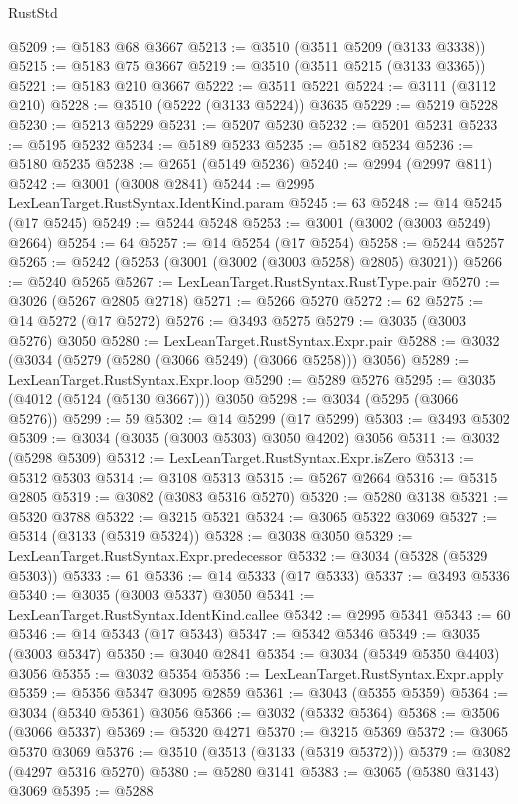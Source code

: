 \begin{lexlean}{RustStd}
\begin{coremodule}
@5209 := @5183 @68 @3667
@5213 := @3510 (@3511 @5209 (@3133 @3338))
@5215 := @5183 @75 @3667
@5219 := @3510 (@3511 @5215 (@3133 @3365))
@5221 := @5183 @210 @3667
@5222 := @3511 @5221
@5224 := @3111 (@3112 @210)
@5228 := @3510 (@5222 (@3133 @5224)) @3635
@5229 := @5219 @5228
@5230 := @5213 @5229
@5231 := @5207 @5230
@5232 := @5201 @5231
@5233 := @5195 @5232
@5234 := @5189 @5233
@5235 := @5182 @5234
@5236 := @5180 @5235
@5238 := @2651 (@5149 @5236)
@5240 := @2994 (@2997 @811)
@5242 := @3001 (@3008 @2841)
@5244 := @2995 LexLeanTarget.RustSyntax.IdentKind.param
@5245 := 63
@5248 := @14 @5245 (@17 @5245)
@5249 := @5244 @5248
@5253 := @3001 (@3002 (@3003 @5249) @2664)
@5254 := 64
@5257 := @14 @5254 (@17 @5254)
@5258 := @5244 @5257
@5265 := @5242 (@5253 (@3001 (@3002 (@3003 @5258) @2805) @3021))
@5266 := @5240 @5265
@5267 := LexLeanTarget.RustSyntax.RustType.pair
@5270 := @3026 (@5267 @2805 @2718)
@5271 := @5266 @5270
@5272 := 62
@5275 := @14 @5272 (@17 @5272)
@5276 := @3493 @5275
@5279 := @3035 (@3003 @5276) @3050
@5280 := LexLeanTarget.RustSyntax.Expr.pair
@5288 := @3032 (@3034 (@5279 (@5280 (@3066 @5249) (@3066 @5258))) @3056)
@5289 := LexLeanTarget.RustSyntax.Expr.loop
@5290 := @5289 @5276
@5295 := @3035 (@4012 (@5124 (@5130 @3667))) @3050
@5298 := @3034 (@5295 (@3066 @5276))
@5299 := 59
@5302 := @14 @5299 (@17 @5299)
@5303 := @3493 @5302
@5309 := @3034 (@3035 (@3003 @5303) @3050 @4202) @3056
@5311 := @3032 (@5298 @5309)
@5312 := LexLeanTarget.RustSyntax.Expr.isZero
@5313 := @5312 @5303
@5314 := @3108 @5313
@5315 := @5267 @2664
@5316 := @5315 @2805
@5319 := @3082 (@3083 @5316 @5270)
@5320 := @5280 @3138
@5321 := @5320 @3788
@5322 := @3215 @5321
@5324 := @3065 @5322 @3069
@5327 := @5314 (@3133 (@5319 @5324))
@5328 := @3038 @3050
@5329 := LexLeanTarget.RustSyntax.Expr.predecessor
@5332 := @3034 (@5328 (@5329 @5303))
@5333 := 61
@5336 := @14 @5333 (@17 @5333)
@5337 := @3493 @5336
@5340 := @3035 (@3003 @5337) @3050
@5341 := LexLeanTarget.RustSyntax.IdentKind.callee
@5342 := @2995 @5341
@5343 := 60
@5346 := @14 @5343 (@17 @5343)
@5347 := @5342 @5346
@5349 := @3035 (@3003 @5347)
@5350 := @3040 @2841
@5354 := @3034 (@5349 @5350 @4403) @3056
@5355 := @3032 @5354
@5356 := LexLeanTarget.RustSyntax.Expr.apply
@5359 := @5356 @5347 @3095 @2859
@5361 := @3043 (@5355 @5359)
@5364 := @3034 (@5340 @5361) @3056
@5366 := @3032 (@5332 @5364)
@5368 := @3506 (@3066 @5337)
@5369 := @5320 @4271
@5370 := @3215 @5369
@5372 := @3065 @5370 @3069
@5376 := @3510 (@3513 (@3133 (@5319 @5372)))
@5379 := @3082 (@4297 @5316 @5270)
@5380 := @5280 @3141
@5383 := @3065 (@5380 @3143) @3069
@5395 := @5288

\end{coremodule}
\end{lexlean}
